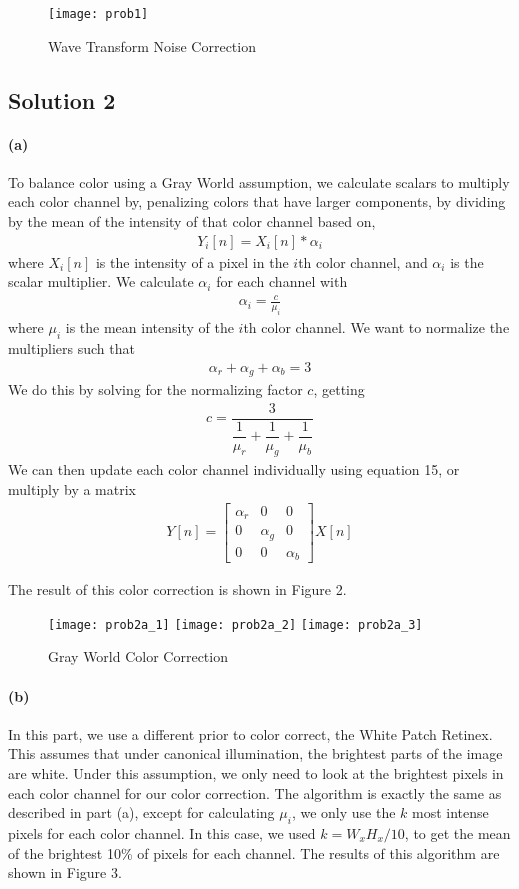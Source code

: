 \documentclass{article}
\newcommand{\solution}[1]{\clearpage \subsection*{Solution #1}}
\newcommand{\spart}[1]{\paragraph{(#1)}}
\begin{document}
\begin{figure*}[!h]
  \centering
  \texttt{[image: prob1]}
  \caption{Wave Transform Noise Correction}
  \label{fig:p1}
\end{figure*}

\solution{2} 

\spart{a} To balance color using a Gray World assumption, we calculate scalars to multiply each color channel by, penalizing colors that have larger components, by dividing by the mean of the intensity of that color channel based on,
\begin{align}
	Y_i[n] = X_i[n]*\alpha_i
\end{align}
where $X_i[n]$ is the intensity of a pixel in the $i$th color channel, and $\alpha_i$ is the scalar multiplier. We calculate $\alpha_i$ for each channel with
\begin{align}
	\alpha_i = \frac{c}{\mu_i}
\end{align}
where $\mu_i$ is the mean intensity of the $i$th color channel. We want to normalize the multipliers such that
\begin{align}
	\alpha_r+\alpha_g+\alpha_b = 3
\end{align}
We do this by solving for the normalizing factor $c$, getting 
\begin{align}
	c = \dfrac{3}{\dfrac{1}{\mu_r}+\dfrac{1}{\mu_g}+\dfrac{1}{\mu_b}}
\end{align}
We can then update each color channel individually using equation 15, or multiply by a matrix
\begin{align}
	Y[n] = \begin{bmatrix}
		\alpha_r & 0 & 0 \\ 0 & \alpha_g & 0 \\ 0 & 0 & \alpha_b
		\end{bmatrix} X[n]
\end{align}

The result of this color correction is shown in Figure 2.

\begin{figure*}[!h]
	\centering
	\texttt{[image: prob2a\_1]}
	\texttt{[image: prob2a\_2]}
	\texttt{[image: prob2a\_3]}
	\caption{Gray World Color Correction}
	\label{fig:p2a}
\end{figure*}

\spart{b} In this part, we use a different prior to color correct, the White Patch Retinex. This assumes that under canonical illumination, the brightest parts of the image are white. Under this assumption, we only need to look at the brightest pixels in each color channel for our color correction. The algorithm is exactly the same as described in part (a), except for calculating $\mu_i$, we only use the $k$ most intense pixels for each color channel. In this case, we used $k=W_x H_x / 10$, to get the mean of the brightest 10\% of pixels for each channel. The results of this algorithm are shown in Figure 3.\\
\end{document}
